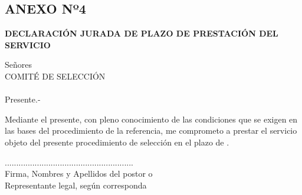 \begin{center}
    \section*{ANEXO Nº4 } 
    \textbf{DECLARACIÓN JURADA DE PLAZO DE PRESTACIÓN DEL SERVICIO}
    \end{center}
    
    Señores \\
    COMITÉ DE SELECCIÓN \\
    \nomenclatura \\
    Presente.-
    
    \vspace{0.5cm}
    
    Mediante el presente, con pleno conocimiento de las condiciones que se exigen en las bases del procedimiento de la referencia, me comprometo a prestar el servicio objeto del presente procedimiento de selección en el plazo de \plazo .
    
    \vspace{0.5cm}
    
    \fecha 
    
    \vspace{2cm}
    
    \begin{center}
    ........................................................\\
    Firma, Nombres y Apellidos del postor o \\ 
    Representante legal, según corresponda
    \end{center}